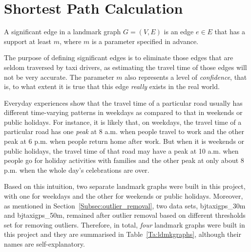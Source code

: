 \chapter{Shortest Path Calculation}


\begin{defn}
A significant edge in a landmark graph $G=(V,E)$ is an edge $e \in E$ that has a support at least $m$, where $m$ is a parameter specified in advance.
\end{defn}

The purpose of defining significant edges is to eliminate those edges that are seldom traversed by taxi drivers, as estimating the travel time of those edges will not be very accurate. The parameter $m$ also represents a level of \emph{confidence}, that is, to what extent it is true that this edge \emph{really} exists in the real world. 

Everyday experiences show that the travel time of a particular road usually has different time-varying patterns in weekdays as compared to that in weekends or public holidays. For instance, it is likely that, on weekdays, the travel time of a particular road has one \emph{peak} at 8 a.m. when people travel to work and the other peak at 6 p.m. when people return home after work. But when it is weekends or public holidays, the travel time of that road may have a peak at 10 a.m. when people go for holiday activities with families and the other peak at only about 8 p.m. when the whole day's celebrations are over. 

Based on this intuition, two separate landmark graphs were built in this project, with one for weekdays and the other for weekends or public holidays. Moreover, as mentioned in Section~\ref{Subsec:outlier_removal}, 
two data sets, bjtaxigps\_30m and bjtaxigps\_50m, remained after outlier removal based on different thresholds set for removing outliers. Therefore, in total, \emph{four} landmark graphs were built in this project and they are summarised in Table~\ref{Ta:ldmkgraphs}, although their names are self-explanatory. 

\begin{table}[h!]
\centering
{}
\caption{An summary of landmark graphs}\label{Ta:ldmkgraphs}
\end{table}

